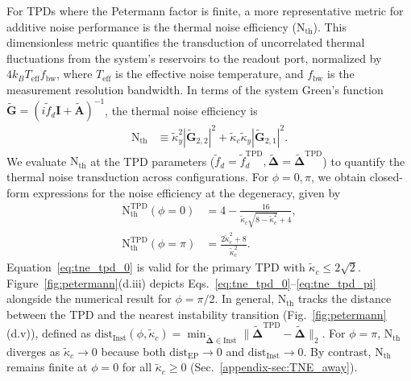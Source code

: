 \documentclass[%
  reprint,
  amsmath,amssymb,
  aps,
  prapplied,
  superscriptaddress,
  longbibliography]{revtex4-2}
\begin{document}
For TPDs where the Petermann factor is finite, a more representative metric for additive noise performance is the thermal noise efficiency ($\mathrm{N}_\text{th}$). This dimensionless metric quantifies the transduction of uncorrelated thermal fluctuations from the system's reservoirs to the readout port, normalized by $4k_B T_\text{eff} f_{\text{bw}}$, where $T_\text{eff}$ is the effective noise temperature, and $f_{\text{bw}}$ is the measurement resolution bandwidth. In terms of the system Green's function $\boldsymbol{\tilde{G}} = (i\tilde{f}_d \boldsymbol{I} + \boldsymbol{\tilde{A}})^{-1}$, the thermal noise efficiency is \cite{kononchuk_exceptional-point-based_2022, clerk_introduction_2010}
\begin{align}
    \mathrm{N}_\text{th} &\equiv \tilde{\kappa}_y^2 |\boldsymbol{\tilde{G}}_{2,2}|^2 + \tilde{\kappa}_c\tilde{\kappa}_y|\boldsymbol{\tilde{G}}_{2,1}|^2. \label{eq:tne_full}
\end{align}
We evaluate $\mathrm{N}_\text{th}$ at the TPD parameters ($\tilde{f}_d = \tilde{f}_d^\text{TPD}, \boldsymbol{\tilde{\Delta}} = \boldsymbol{\tilde{\Delta}}^\text{TPD}$) to quantify the thermal noise transduction across configurations. For $\phi = 0, \pi$, we obtain closed-form expressions for the noise efficiency at the degeneracy, given by
\begin{align}
    \mathrm{N}_\text{th}^\text{TPD}(\phi = 0) &= 4 - \frac{16}{\tilde{\kappa}_c \sqrt{8 - \tilde{\kappa}_c^2}+4},\label{eq:tne_tpd_0} \\
    \mathrm{N}_\text{th}^\text{TPD}(\phi = \pi) &= \frac{2\tilde{\kappa}_c^2 + 8}{\tilde{\kappa}_c^2}.\label{eq:tne_tpd_pi}
\end{align}
Equation~\ref{eq:tne_tpd_0} is valid for the primary TPD with $\tilde{\kappa}_c \leq 2\sqrt{2}$. Figure~\ref{fig:petermann}(d.iii) depicts Eqs.~\ref{eq:tne_tpd_0}--\ref{eq:tne_tpd_pi} alongside the numerical result for $\phi = \pi/2$. In general, $\mathrm{N}_\text{th}$ tracks the distance between the TPD and the nearest instability transition (Fig.~\ref{fig:petermann}(d.v)), defined as $\text{dist}_\text{Inst}(\phi, \tilde{\kappa}_c) = \min_{\boldsymbol{\tilde{\Delta}} \in \text{Inst}} \lVert \boldsymbol{\tilde{\Delta}}^\text{TPD} - \boldsymbol{\tilde{\Delta}} \rVert_2$. For $\phi = \pi$, $\mathrm{N}_\text{th}$ diverges as $\tilde{\kappa}_c \to 0$ because both $\text{dist}_\text{EP} \to 0$ and $\text{dist}_\text{Inst} \to 0$. By contrast, $\mathrm{N}_\text{th}$ remains finite at $\phi = 0$ for all $\tilde{\kappa}_c \geq 0$ (Sec.~\ref{appendix-sec:TNE_away}).
\end{document}
